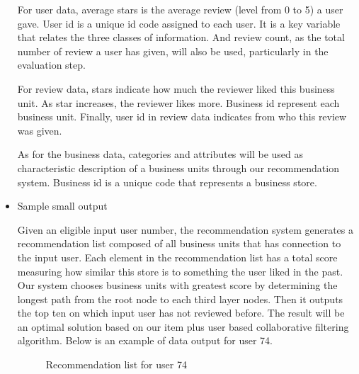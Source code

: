 \begin{itemize}
For user data, average stars is the average review (level from 0 to 5) a user gave. User id is a unique id code assigned to each user. It is a key variable that relates the three classes of information. And review count, as the total number of review a user has given, will also be used, particularly in the evaluation step. 

For review data, stars indicate how much the reviewer liked this business unit. As star increases, the reviewer likes more. Business id represent each business unit. Finally, user id in review data indicates from who this review was given. 

As for the business data, categories and attributes will be used as characteristic description of a business units through our recommendation system. Business id is a unique code that represents a business store.

\item{Sample small output}

Given an eligible input user number, the recommendation system generates a recommendation list composed of all business units that has connection to the input user. Each element in the recommendation list has a total score measuring how similar this store is to something the user liked in the past.  Our system chooses business units with greatest score by determining the longest path from the root  node to each third layer nodes. Then it outputs the top ten on which input user has not reviewed before. The result will be an optimal solution based on our item plus user based collaborative filtering algorithm. Below is an example of data output for user 74. 

\begin{figure}[h] 
	\begin{center}
		\advance\rightskip-1cm
		{}
		\caption{Recommendation list for user 74  }\label{fig:Sample_Output}
 \label{fig:top10RecList}
	\end{center}
\end{figure}


\end{itemize}
